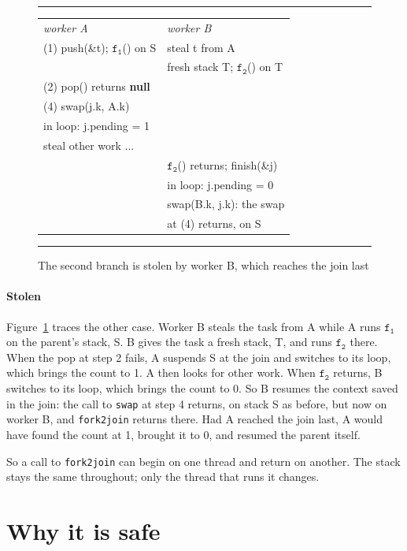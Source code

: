 \documentclass[sigplan,nonacm]{acmart}
\makeatletter
\newcommand{\fo}{\mathtt{f_1}}
\newcommand{\ft}{\mathtt{f_2}}
\newenvironment{timeline}[1]
  {\par\raggedright\noindent\small\ttfamily\begin{tabular}{@{}#1@{}}}
  {\end{tabular}\par}
\newcommand{\tlhead}[1]{{\rmfamily\itshape #1}}
\newcommand{\ind}{\hphantom{(0)~}}
\makeatother
\begin{document}
\begin{figure}
\hrule
\vspace{4pt}
\begin{timeline}{l@{\hspace{1em}}l}
\tlhead{worker A} & \tlhead{worker B} \\
(1) push(\&t); $\fo$() on S & steal t from A \\
& fresh stack T; $\ft$() on T \\
(2) pop() returns \textbf{null} \\
(4) swap(j.k, A.k) \\
\ind in loop: j.pending = 1 \\
\ind steal other work ... \\
& $\ft$() returns; finish(\&j) \\
& in loop: j.pending = 0 \\
& swap(B.k, j.k): the swap \\
& at (4) returns, on S
\end{timeline}
\vspace{4pt}
\hrule
\caption{The second branch is stolen by worker B, which reaches the
  join last}
\label{fig:cases}
\end{figure}

\paragraph{Stolen}
%
Figure~\ref{fig:cases} traces the other case.
%
Worker B steals the task from A while A runs $\fo$ on the parent's
stack, S.
%
B gives the task a fresh stack, T, and runs $\ft$ there.
%
When the pop at step 2 fails, A suspends S at the join and switches to
its loop, which brings the count to 1.
%
A then looks for other work.
%
When $\ft$ returns, B switches to its loop, which brings the count to
0.
%
So B resumes the context saved in the join: the call to
\lstinline|swap| at step 4 returns, on stack S as before, but now on
worker B, and \lstinline|fork2join| returns there.
%
Had A reached the join last, A would have found the count at 1,
brought it to 0, and resumed the parent itself.

So a call to \lstinline|fork2join| can begin on one thread and return on
another.
%
The stack stays the same throughout; only the thread that runs it
changes.

\section{Why it is safe}
\label{sec:safety}
\end{document}
